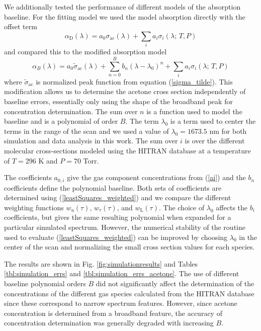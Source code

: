 \documentclass[12pt]{report}
\begin{document}
	We additionally tested the performance of different models of the absorption baseline. For the fitting model we used the model absorption directly with the offset term
	\begin{equation}\label{alpha_D}
		\alpha_\mathrm{D}(\lambda) = a_0 \sigma_\mathrm{ac}(\lambda) + \sum_{i} a_i \sigma_i (\lambda ;\, T, P)
	\end{equation}
	and compared this to the modified absorption model
	\begin{equation}\label{alpha_B}
		\alpha_B(\lambda) = a_0 \tilde{\sigma}_\mathrm{ac}(\lambda) + \sum_{n=0}^B b_n (\lambda-\lambda_0)^n + \sum_{i} a_i \sigma_i (\lambda;\, T, P)
	\end{equation}
	where $\tilde{\sigma}_\mathrm{ac}$ is normalized peak function from equation (\ref{sigma_tilde}). This modification allows us to determine the acetone cross section independently of baseline errors, essentially only using the shape of the broadband peak for concentration determination. The sum over $n$ is a function used to model the baseline and is a polynomial of order $B$. The term $\lambda_0$ is a term used to center the terms in the range of the scan and we used a value of $\lambda_0=1673.5$ nm for both simulation and data analysis in this work. The sum over $i$ is over the different molecular cross-sections modeled using the HITRAN database at a temperature of $T=296$ K and $P=70$ Torr.
	
	The coefficients $a_{0,i}$ give the gas component concentrations from (\ref{ai}) and the $b_n$ coefficients define the polynomial baseline. Both sets of coefficients are determined using (\ref{leastSquares_weighted}) and we compare the different weighting functions $w_u(\tau)$, $w_\tau(\tau)$, and $w_\mathrm{L}(\tau)$. The choice of $\lambda_0$ affects the $b_i$ coefficients, but gives the same resulting polynomial when expanded for a particular simulated spectrum. However, the numerical stability of the routine used to evaluate (\ref{leastSquares_weighted}) can be improved by choosing $\lambda_0$ in the center of the scan and normalizing the small cross section values for each species.
	
	The results are shown in Fig. \ref{fig:simulationresults} and Tables \ref{tbl:simulation_errs} and \ref{tbl:simulation_errs_acetone}. The use of different baseline polynomial orders $B$ did not significantly affect the determination of the concentrations of the different gas species calculated from the HITRAN database since these correspond to narrow spectrum features. However, since acetone concentration is determined from a broadband feature, the accuracy of concentration determination was generally degraded with increasing $B$.
	
\end{document}
